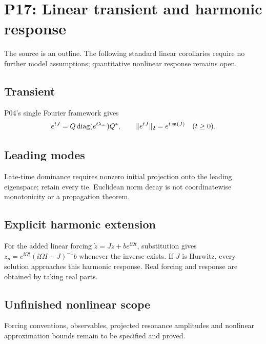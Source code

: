 \section{P17: Linear transient and harmonic response}
\label{sec:P17}
The source is an outline. The following standard linear corollaries require
no further model assumptions; quantitative nonlinear response remains open.
\subsection{Transient}\label{slot:P17-1}
P04's single Fourier framework \cite[Theorem~3.1]{Gray2006} gives
\[
 e^{tJ}=Q\operatorname{diag}(e^{t\lambda_m})Q^*,\qquad
 \|e^{tJ}\|_2=e^{t\operatorname{sa}(J)}\quad(t\ge0).
\]
\subsection{Leading modes}\label{slot:P17-2}
Late-time dominance requires nonzero initial projection onto the leading
eigenspace; retain every tie. Euclidean norm decay is not coordinatewise
monotonicity or a propagation theorem.
\subsection{Explicit harmonic extension}\label{slot:P17-3}
For the added linear forcing $\dot z=Jz+be^{\ii\Omega t}$, substitution
gives $z_p=e^{\ii\Omega t}(\ii\Omega I-J)^{-1}b$ whenever the inverse
exists. If $J$ is Hurwitz, every solution approaches this harmonic response.
Real forcing and response are obtained by taking real parts.
\subsection{Unfinished nonlinear scope}\label{slot:P17-4}
Forcing conventions, observables, projected resonance amplitudes and
nonlinear approximation bounds remain to be specified and proved.
